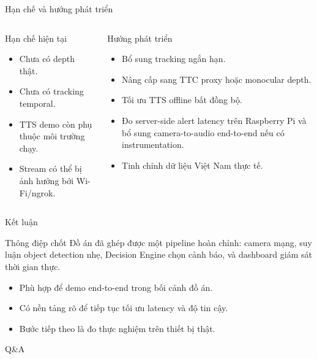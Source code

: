 \documentclass[aspectratio=169]{beamer}
\begin{document}
\begin{frame}{Hạn chế và hướng phát triển}
  \begin{columns}[T,onlytextwidth]
    \begin{block}{Hạn chế hiện tại}
      \begin{itemize}
        \item Chưa có depth thật.
        \item Chưa có tracking temporal.
        \item TTS demo còn phụ thuộc môi trường chạy.
        \item Stream có thể bị ảnh hưởng bởi Wi-Fi/ngrok.
      \end{itemize}
    \end{block}
    \begin{block}{Hướng phát triển}
      \begin{itemize}
        \item Bổ sung tracking ngắn hạn.
        \item Nâng cấp sang TTC proxy hoặc monocular depth.
        \item Tối ưu TTS offline bất đồng bộ.
        \item Đo server-side alert latency trên Raspberry Pi và bổ sung camera-to-audio end-to-end nếu có instrumentation.
        \item Tinh chỉnh dữ liệu Việt Nam thực tế.
      \end{itemize}
    \end{block}
  \end{columns}
\end{frame}

\begin{frame}{Kết luận}
  \begin{block}{Thông điệp chốt}
    Đồ án đã ghép được một pipeline hoàn chỉnh: camera mạng, suy luận object detection nhẹ, Decision Engine chọn cảnh báo, và dashboard giám sát thời gian thực.
  \end{block}
  \begin{itemize}
    \item Phù hợp để demo end-to-end trong bối cảnh đồ án.
    \item Có nền tảng rõ để tiếp tục tối ưu latency và độ tin cậy.
    \item Bước tiếp theo là đo thực nghiệm trên thiết bị thật.
  \end{itemize}
  \vfill
  \begin{center}
    \Large{Q\&A}
  \end{center}
\end{frame}
\end{document}
